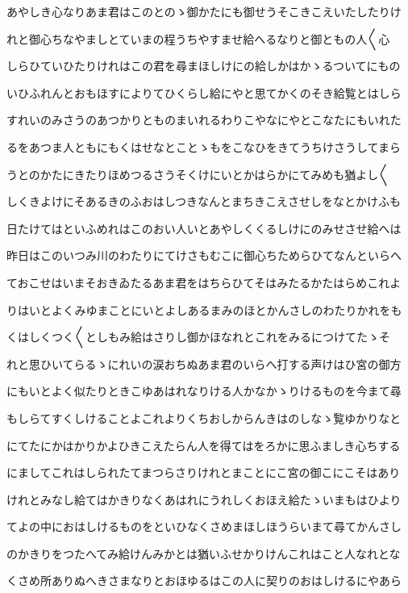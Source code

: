 \documentclass[a4paper,11pt,landscape]{ltjtarticle}
\begin{document}
あやしき心なりあま君はこのとのゝ御かたにも御せうそこきこえいたしたりけ
\par\medskip
れと御心ちなやましとていまの程うちやすませ給へるなりと御ともの人〱心
\par\medskip
しらひていひたりけれはこの君を尋まほしけにの給しかはかゝるついてにもの
\par\medskip
いひふれんとおもほすによりてひくらし給にやと思てかくのそき給覧とはしら
\par\medskip
すれいのみさうのあつかりとものまいれるわりこやなにやとこなたにもいれた
\par\medskip
るをあつま人ともにもくはせなとことゝもをこなひをきてうちけさうしてまら
\par\medskip
うとのかたにきたりほめつるさうそくけにいとかはらかにてみめも猶よし〱
\par\medskip
しくきよけにそあるきのふおはしつきなんとまちきこえさせしをなとかけふも
\par\medskip
日たけてはといふめれはこのおい人いとあやしくくるしけにのみせさせ給へは
\par\medskip
昨日はこのいつみ川のわたりにてけさもむこに御心ちためらひてなんといらへ
\par\medskip
ておこせはいまそおきゐたるあま君をはちらひてそはみたるかたはらめこれよ
\par\medskip
りはいとよくみゆまことにいとよしあるまみのほとかんさしのわたりかれをも
\par\medskip
くはしくつく〱としもみ給はさりし御かほなれとこれをみるにつけてたゝそ
\par\medskip
れと思ひいてらるゝにれいの涙おちぬあま君のいらへ打する声けはひ宮の御方
\par\medskip
にもいとよく似たりときこゆあはれなりける人かなかゝりけるものを今まて尋
\par\medskip
もしらてすくしけることよこれよりくちおしからんきはのしなゝ覧ゆかりなと
\par\medskip
にてたにかはかりかよひきこえたらん人を得てはをろかに思ふましき心ちする
\par\medskip
にましてこれはしられたてまつらさりけれとまことにこ宮の御こにこそはあり
\par\medskip
けれとみなし給てはかきりなくあはれにうれしくおほえ給たゝいまもはひより
\par\medskip
てよの中におはしけるものをといひなくさめまほしほうらいまて尋てかんさし
\par\medskip
のかきりをつたへてみ給けんみかとは猶いふせかりけんこれはこと人なれとな
\par\medskip
くさめ所ありぬへきさまなりとおほゆるはこの人に契りのおはしけるにやあら
\end{document}
